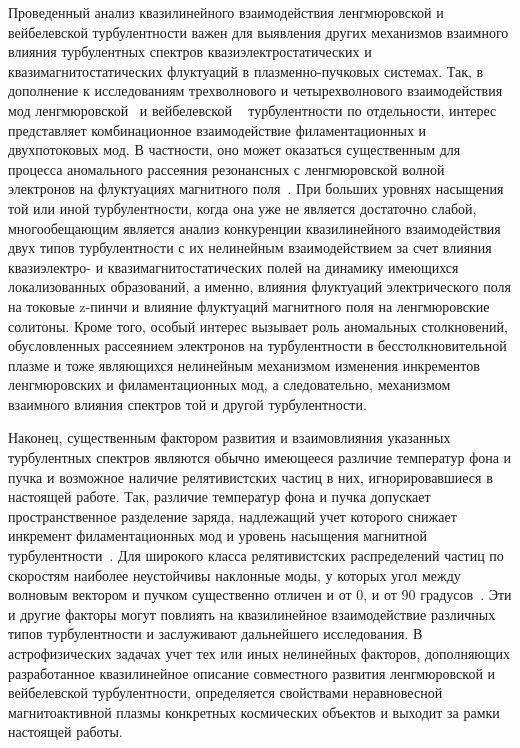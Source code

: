 Проведенный анализ квазилинейного взаимодействия ленгмюровской и вейбелевской турбулентности важен для выявления других механизмов взаимного влияния турбулентных спектров квазиэлектростатических и квазимагнитостатических флуктуаций в плазменно-пучковых системах. Так, в дополнение к исследованиям трехволнового и четырехволнового взаимодействия мод ленгмюровской~\cite{Kasaba2001,Ziebell2008} и вейбелевской ~\cite{Garasev2021,Kuznetsov2025} турбулентности по отдельности, интерес представляет комбинационное взаимодействие филаментационных и двухпотоковых мод. В частности, оно может оказаться существенным для процесса аномального рассеяния резонансных с ленгмюровской волной электронов на флуктуациях магнитного поля~\cite{Fleishman2013,Medvedev2017}. При больших уровнях насыщения той или иной турбулентности, когда она уже не является достаточно слабой, многообещающим является анализ конкуренции квазилинейного взаимодействия двух типов турбулентности с их нелинейным взаимодействием за счет влияния квазиэлектро- и квазимагнитостатических полей на динамику имеющихся локализованных образований, а именно, влияния флуктуаций электрического поля на токовые z-пинчи и влияние флуктуаций магнитного поля на ленгмюровские солитоны. Кроме того, особый интерес вызывает роль аномальных столкновений, обусловленных рассеянием электронов на турбулентности в бесстолкновительной плазме и тоже являющихся нелинейным механизмом изменения инкрементов ленгмюровских и филаментационных мод, а следовательно, механизмом взаимного влияния спектров той и другой турбулентности.  

Наконец, существенным фактором развития и взаимовлияния указанных турбулентных спектров являются обычно имеющееся различие температур фона и пучка и возможное наличие релятивистских частиц в них, игнорировавшиеся в настоящей работе. Так, различие температур фона и пучка допускает пространственное разделение заряда, надлежащий учет которого снижает инкремент филаментационных мод и уровень насыщения магнитной турбулентности~\cite{Tzoufras2006,Hao2008}. 
Для широкого класса релятивистских распределений частиц по скоростям наиболее неустойчивы наклонные моды, у которых угол между волновым вектором и пучком существенно отличен и от $0$, и от $90$ градусов~\cite{Bret2004,Bret2010}. Эти и другие факторы могут повлиять на квазилинейное взаимодействие различных типов турбулентности и заслуживают дальнейшего исследования. В астрофизических задачах учет тех или иных нелинейных факторов, дополняющих разработанное квазилинейное описание совместного развития ленгмюровской и вейбелевской турбулентности, определяется свойствами неравновесной магнитоактивной плазмы конкретных космических объектов и выходит за рамки настоящей работы.

